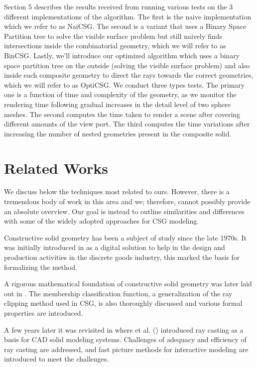\documentclass[a4paper,11pt,oneside]{article}
\begin{document}
Section 5 describes the results received from running various tests on the 3 different implementations of the algorithm. The first is the naive implementation which we refer to as NaiCSG. The second is a variant that uses a Binary Space Partition tree to solve the visible surface problem but still naively finds intersections inside the combinatorial geometry, which we will refer to as BinCSG. Lastly, we'll introduce our optimized algorithm which uses a binary space partition tree on the outside (solving the visible surface problem) and also inside each composite geometry to direct the rays towards the correct geometries, which we will refer to as OptiCSG. We conduct three types tests. The primary one is a function of time and complexity of the geometry, as we monitor the rendering time following gradual increases in the detail level of two sphere meshes. The second computes the time taken to render a scene after covering different amounts of the view port. The third computes the time variations after increasing the number of nested geometries present in the composite solid.
  
  
\section{Related Works}
  
We discuss below the techniques most related to ours. However, there is a tremendous body of work in this area and we; therefore, cannot possibly provide an absolute overview. Our goal is instead to outline similarities and differences with some of the widely adopted approaches for CSG modeling.

Constructive solid geometry has been a subject of study since the late 1970s. It was initially introduced in \cite{GEOMETRIC_MODELING_1977} as a digital solution to help in the design and production activities in the discrete goods industry, this marked the basis for formalizing the method.
  
A rigorous mathematical foundation of constructive solid geometry was later laid out in \cite{Requicha1978MathematicalFO}. The membership classification function, a generalization of the ray clipping method used in CSG, is also thoroughly discussed and various formal properties are introduced.
  
A few years later it was revisited in \cite{ROTH1982109} where \citeauthor{ROTH1982109} et al. (\citeyear{ROTH1982109}) introduced ray casting as a basis for CAD solid modeling systems. Challenges of adequacy and efficiency of ray casting are addressed, and fast picture methods for interactive modeling are introduced to meet the challenges.
  
\end{document}

